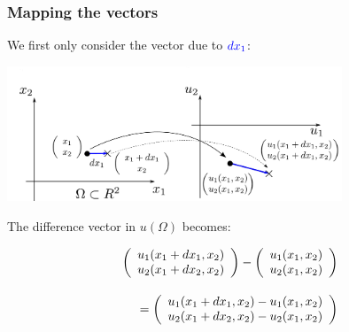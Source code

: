 \newpage

\subsubsection{Mapping the vectors}

\begin{frame}{\subsubsecname}

We first only consider the vector due to ${\color{blue}dx_1}$:

\svspace{-5mm}

\begin{center}
\includegraphics[width=0.75\textwidth]{img/x1.pdf}
\end{center}

\svspace{-3mm}

\pause

The difference vector in $u(\Omega)$ becomes:

\begin{equation}
\begin{array}{r}
\left( \begin{array}{rrrrrrrrrrrrrrrrrrrrrrrrrr} 
u_1 (x_1 + dx_1, x_2)\\
u_2 (x_1 + dx_2, x_2)
\\ \end{array} \right) - 
\left( \begin{array}{rrrrrrrrrrrrrrrrrrrrrrrrrr} 
u_1 (x_1, x_2)\\
u_2 (x_1, x_2)
\\ \end{array} \right) \\[0.7cm]
=
\left( \begin{array}{rrrrrrrrrrrrrrrrrrrrrrrrrr} 
u_1 (x_1 + dx_1, x_2) - u_1 (x_1, x_2)\\
u_2 (x_1 + dx_2, x_2) - u_2 (x_1, x_2)
\\ \end{array} \right)
\end{array}
\end{equation}

\end{frame}

